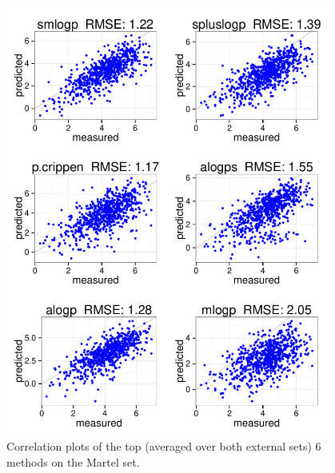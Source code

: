 \documentclass[]{article}
\begin{document}
\begin{figure}[ht]
  \centering
  \includegraphics[width=0.95\textwidth]{./figures_si/martel_scatter_1.pdf}
  \caption{Correlation plots of the top (averaged over both external sets) 6 methods on the Martel set.}
  \label{fig:external_comparison1}
\end{figure}
\end{document}
